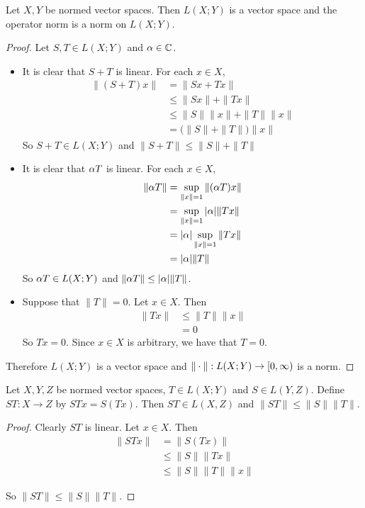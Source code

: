 \documentclass{book}
\begin{document}
	\begin{ex} 
		Let $X, Y$ be normed vector spaces. Then $L(X; Y)$ is a vector space and the operator norm is a norm on $L(X; Y)$.
	\end{ex}
	
	\begin{proof}
		Let $S,T \in L(X;Y)$ and $\alpha \in \mathbb{C}$. 
		\begin{itemize}
			\item It is clear that $S+T$ is linear. For each $x \in X$,
			\begin{align*}
				\|(S+T)x \|
				&= \|Sx+Tx \|\\
				& \leq \|Sx \|+ \|Tx \|\\
				&\leq \|S \|\|x \|+ \|T \|\|x \|\\
				&= \big(\|S \|+ \|T \|\big) \|x \|
			\end{align*}
			So $S+T \in L(X;Y)$ and $\|S+T\|\leq \|S \|+ \|T \|$
			\item It is clear that $\alpha T$ is linear. For each $x \in X$,
			\begin{align*}
				\|\alpha T \|
				&= \sup_{\|x \|=1} \|(\alpha T)x \|\\
				&= \sup_{\|x \|=1} \vert \alpha \vert \|Tx \|\\
				&=\vert \alpha \vert \sup_{\|x \|=1} \|Tx \|\\
				&=\vert \alpha \vert \|T \|
			\end{align*} 
			So $\alpha T \in L(X;Y)$ and $\|\alpha T\| \leq |\alpha| \|T\|$.
			\item Suppose that $\|T\| = 0$.  Let $x \in X$. Then  
			\begin{align*}
				\|T x\|
				& \leq \|T \|\|x \| \\
				& = 0
			\end{align*}
			So $Tx=0$. Since $x \in X$ is arbitrary, we have that $T=0$. 
		\end{itemize}
		Therefore $L(X;Y)$ is a vector space and $\|\cdot\|: L(X;Y) \rightarrow [0,\infty)$ is a norm.
	\end{proof}
	
	\begin{ex} 
		Let $X,Y,Z$ be normed vector spaces, $T \in L(X; Y)$ and $S \in L(Y,Z)$. Define $ST:X \rightarrow Z$ by $STx = S(Tx)$. Then $ST \in L(X,Z)$ and $\|ST \|\leq \|S \|\|T \|$. 
	\end{ex}
	
	\begin{proof}
		Clearly $ST$ is linear. Let $x \in X$. Then 
		\begin{align*}
			\|ST x \|
			& = \|S(Tx) \|\\
			& \leq \|S \|\|Tx \|\\
			& \leq \|S \|\|T \|\|x \|
		\end{align*}
		
		So $\|ST \|\leq \|S \|\|T \|$.
	\end{proof}
	
\end{document}
